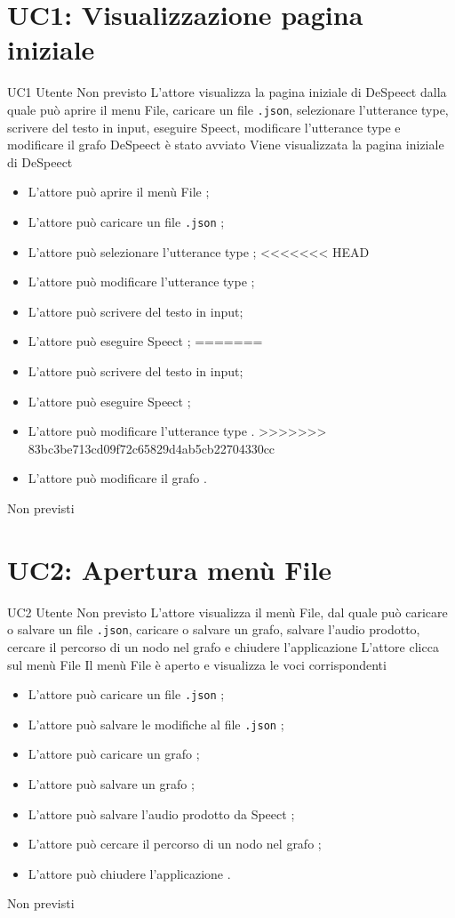 \documentclass[../AnalisideiRequisiti.tex]{subfiles}
\begin{document}
	\section{UC1: Visualizzazione pagina iniziale} 
		
	\UserCase
	{UC1}
	{Utente}
	{Non previsto}
	{L'attore visualizza la pagina iniziale di DeSpeect dalla quale può aprire il menu File, caricare un file \verb|.json|, selezionare l'utterance type, scrivere del testo in input, eseguire Speect, modificare l'utterance type e modificare il grafo}
	{DeSpeect è stato avviato}
	{Viene visualizzata la pagina iniziale di DeSpeect}
	{\begin{itemize}
			\item{} L'attore può aprire il menù File ;
			\item{} L'attore può caricare un file \verb|.json| ;
			\item{} L'attore può selezionare l'utterance type ;
<<<<<<< HEAD
			\item{} L'attore può modificare l'utterance type ;
			\item{} L'attore può scrivere del testo in input;
			\item{} L'attore può eseguire Speect ;
=======
			\item{} L'attore può scrivere del testo in input;
			\item{} L'attore può eseguire Speect ;
			\item{} L'attore può modificare l'utterance type .
>>>>>>> 83bc3be713cd09f72c65829d4ab5cb22704330cc
			\item{} L'attore può modificare il grafo .
	\end{itemize}}
	{Non previsti}
	
	
	\section{UC2: Apertura menù File}

	\UserCase
	{UC2}
	{Utente}
	{Non previsto}
	{L'attore visualizza il menù File, dal quale può caricare o salvare un file \verb|.json|, caricare o salvare un grafo, salvare l'audio prodotto, cercare il percorso di un nodo nel grafo e chiudere l'applicazione}
	{L'attore clicca sul menù File}
	{Il menù File è aperto e visualizza le voci corrispondenti}
	{	\begin{itemize}
		\item{} L'attore può caricare un file \verb|.json| ;
		\item{} L'attore può salvare le modifiche al file \verb|.json| ;
		\item{} L'attore può caricare un grafo ;
		\item{} L'attore può salvare un grafo ;
		\item{} L'attore può salvare l'audio prodotto da Speect ;
		\item{} L'attore può cercare il percorso di un nodo nel grafo ;
		\item{} L'attore può chiudere l'applicazione .
		\end{itemize}
	}
	{Non previsti}
\end{document}
